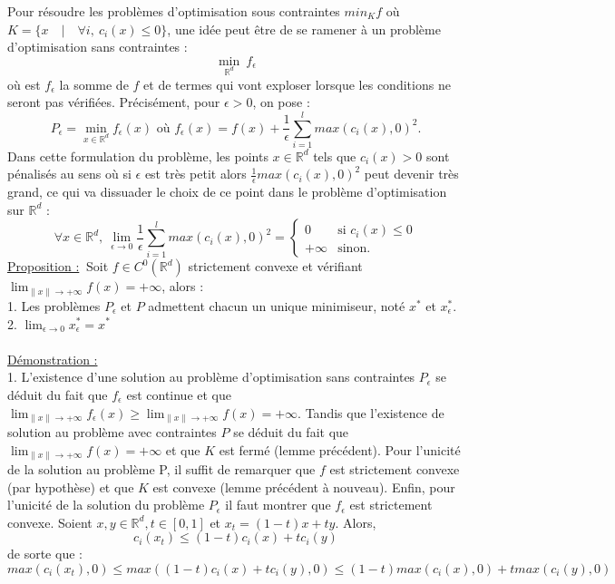\documentclass[12pt]{article}
\newcommand{\Rd}{\mathbb{R}^d}
\newcommand{\prop}{\underline{Proposition :}}
\newcommand{\demo}{\underline{Démonstration :}}
\begin{document}
Pour résoudre les problèmes d'optimisation sous contraintes $min_K f$ où $K = \{x \quad | \quad \forall i, \: c_i(x) \leq 0\}$, une idée peut être de se ramener à un problème d'optimisation sans contraintes : 
\[
\min_{\Rd} \: f_\epsilon\] 
où est $f_\epsilon$ la somme de $f$ et de termes qui vont exploser lorsque les conditions ne seront pas vérifiées. Précisément, pour $\epsilon > 0$, on pose :
\[
P_\epsilon = \min_{x\in\Rd} f_\epsilon(x) \text{ où } f_\epsilon(x) = f(x) + \frac{1}{\epsilon} \sum^{l}_{i = 1}max(c_i(x),0)^2.
\]
Dans cette formulation du problème, les points $x \in \Rd$ tels que $c_i(x) > 0$ sont pénalisés au sens où si $\epsilon$ est très petit alors $\frac{1}{\epsilon}max(c_i(x),0)^2$ peut devenir très grand, ce qui va dissuader le choix de ce point dans le problème d'optimisation sur $\Rd$ :
\[
\forall x \in \Rd, \: \lim_{\epsilon \to 0}\frac{1}{\epsilon} \sum^{l}_{i = 1}max(c_i(x),0)^2 = \left\{
    \begin{array}{ll}
        0 & \mbox{si } c_i(x) \leq 0 \\
        +\infty & \mbox{sinon.}
    \end{array}
\right.
\]
\prop $\:$ Soit $f \in C^0(\Rd)$ strictement convexe et vérifiant $\lim_{\lVert x\lVert \to +\infty} f(x) = +\infty$, alors :\\
1. Les problèmes $P_\epsilon$ et $P$ admettent chacun un unique minimiseur, noté $x^*$ et $x^*_\epsilon$.\\
2. $\lim_{\epsilon\to 0} x^*_\epsilon = x^*$\\
\\
\demo $\:$\\
1. L'existence d'une solution au problème d'optimisation sans contraintes $P_\epsilon$ se déduit du fait que $f_\epsilon$ est continue et que $\lim_{\lVert x\lVert \to +\infty} f_{\epsilon}(x) \geq \lim_{\lVert x\lVert \to +\infty} f(x) = +\infty$. Tandis que l'existence de solution au problème avec contraintes $P$ se déduit du fait que $\lim_{\lVert x\lVert \to +\infty} f(x) = +\infty$ et que $K$ est fermé (lemme précédent). Pour l'unicité de la solution au problème P, il suffit de remarquer que $f$ est strictement convexe (par hypothèse) et que $K$ est convexe (lemme précédent à nouveau). Enfin, pour l'unicité de la solution du problème $P_\epsilon$ il faut montrer que $f_\epsilon$ est strictement convexe. Soient $x,y \in \Rd, t \in [0,1]$ et $x_t = (1-t)x + ty$. Alors,
\[
c_i(x_t) \leq (1-t)c_i(x) + tc_i(y)
\]
de sorte que :
\[
max(c_i(x_t),0) \leq max((1-t)c_i(x) + tc_i(y),0) \leq (1-t)max(c_i(x),0) + tmax(c_i(y),0)
\]
\end{document}
